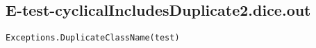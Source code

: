 \subsection{E-test-cyclicalIncludesDuplicate2.dice.out}
\begin{verbatim}
Exceptions.DuplicateClassName(test)

\end{verbatim}